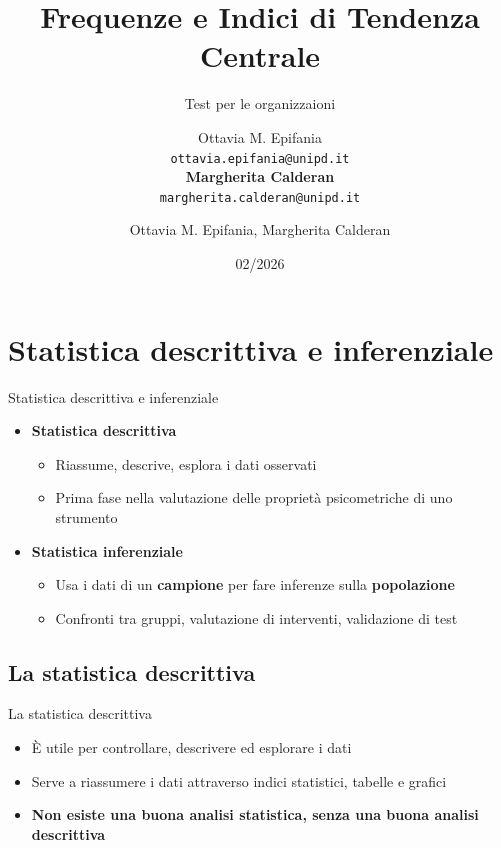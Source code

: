 \documentclass[
  ignorenonframetext,
  compress, aspectratio=149]{beamer}
\author{Ottavia M. Epifania \\
  \texttt{ottavia.epifania@unipd.it} \\
  \textbf{Margherita Calderan} \\
  \texttt{margherita.calderan@unipd.it}}
\title{Frequenze e Indici di Tendenza Centrale}
\subtitle{Test per le organizzaioni}
\author{Ottavia M. Epifania, Margherita Calderan}
\date{02/2026}
\providecommand{\tightlist}{%
  \setlength{\itemsep}{0pt}\setlength{\parskip}{0pt}}
\begin{document}
\frame{\titlepage}


\section{Statistica descrittiva e
inferenziale}\label{statistica-descrittiva-e-inferenziale}

\begin{frame}{Statistica descrittiva e inferenziale}
\begin{itemize}
\tightlist
\item
  \textbf{Statistica descrittiva}

  \begin{itemize}
  \tightlist
  \item
    Riassume, descrive, esplora i dati osservati\\
  \item
    Prima fase nella valutazione delle proprietà psicometriche di uno
    strumento
  \end{itemize}
\item
  \textbf{Statistica inferenziale}

  \begin{itemize}
  \tightlist
  \item
    Usa i dati di un \textbf{campione} per fare inferenze sulla
    \textbf{popolazione}\\
  \item
    Confronti tra gruppi, valutazione di interventi, validazione di test
  \end{itemize}
\end{itemize}
\end{frame}

\subsection{La statistica descrittiva}\label{la-statistica-descrittiva}

\begin{frame}{La statistica descrittiva}
\begin{itemize}
\item
  È utile per controllare, descrivere ed esplorare i dati
\item
  Serve a riassumere i dati attraverso indici statistici, tabelle e
  grafici
\item
  \textbf{Non esiste una buona analisi statistica, senza una buona
  analisi descrittiva}
\end{itemize}
\end{frame}
\end{document}
